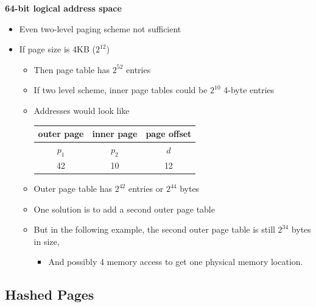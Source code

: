 \documentclass[11pt,a4paper]{article}
\begin{document}
\textbf{64-bit logical address space}
\begin{itemize}
    \item Even two-level paging scheme not sufficient
    \item If page size is 4KB ($2^{12}$)
        \begin{itemize}
            \item Then page table has $2^{52}$ entries
            \item If two level scheme, inner page tables could be $2^{10}$ 4-byte entries
            \item Addresses would look like

                \begin{tabular}{c c c}
                    \toprule
                    outer page         & inner page & page offset \\
                    \midrule
                    $p_1$              & $p_2$      & $d$ \\
                    42                 & 10         & 12 \\
                    \bottomrule
                \end{tabular}

            \item Outer page table has $2^{42}$ entries or $2^{44}$ bytes
            \item One solution is to add a second outer page table
            \item But in the following example, the second outer page table is still
                $2^{34}$ bytes in size,
                \begin{itemize}
                    \item And possibly 4 memory access to get one physical memory location.
                \end{itemize}
        \end{itemize}
\end{itemize}

\subsection{Hashed Pages}
\end{document}
